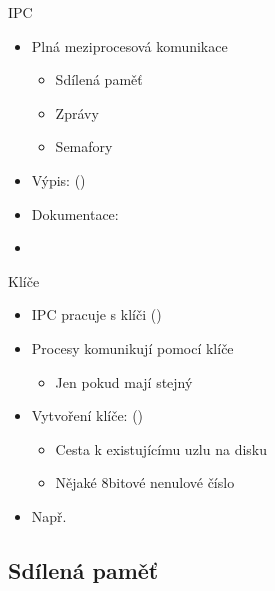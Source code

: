 
\begin{frame}{IPC}

  \begin{itemize}
    \item Plná meziprocesová komunikace
    \begin{itemize}
      \item Sdílená paměť
      \item Zprávy
      \item Semafory
    \end{itemize}

    \pause

    \item Výpis:  ()
    \item Dokumentace: 
    \item {}
  \end{itemize}

\end{frame}

\begin{frame}{Klíče}

  \begin{itemize}
    \item IPC pracuje s klíči ()
    \item Procesy komunikují pomocí klíče
    \begin{itemize}
      \item Jen pokud mají stejný
    \end{itemize}

    \pause

    \item Vytvoření klíče:  ()
    \begin{itemize}
      \item Cesta k existujícímu uzlu na disku
      \item Nějaké 8bitové nenulové číslo
    \end{itemize}

    \pause

    \item Např.\ 
  \end{itemize}

\end{frame}

\iffimuni
\subsection{Sdílená paměť}
\fi

